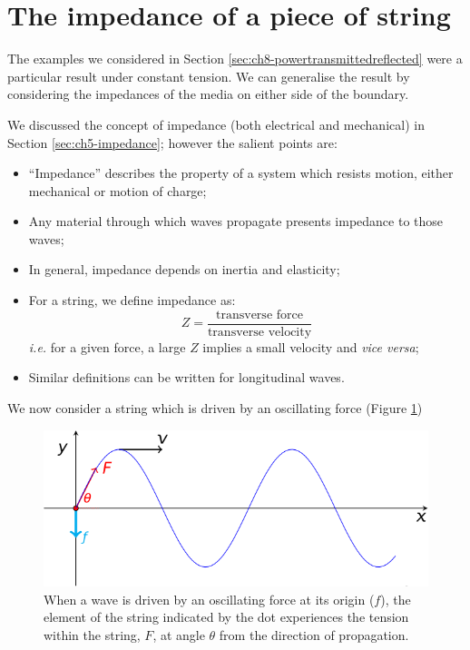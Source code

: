 \documentclass[
]{book}
\providecommand{\tightlist}{%
  \setlength{\itemsep}{0pt}\setlength{\parskip}{0pt}}
\begin{document}
\hypertarget{sec:ch8-stringimpedeance}{%
\section{The impedance of a piece of string}\label{sec:ch8-stringimpedeance}}

The examples we considered in Section \ref{sec:ch8-powertransmittedreflected} were a particular result under constant tension. We can generalise the result by considering the impedances of the media on either side of the boundary.

We discussed the concept of impedance (both electrical and mechanical) in Section \ref{sec:ch5-impedance}; however the salient points are:

\begin{itemize}
\tightlist
\item
  ``Impedance'' describes the property of a system which resists motion, either mechanical or motion of charge;
\item
  Any material through which waves propagate presents impedance to those waves;
\item
  In general, impedance depends on inertia and elasticity;
\item
  For a string, we define impedance as:
  \begin{equation}
  Z = \frac{\textrm{transverse force}}{\textrm{transverse velocity}}
  \end{equation}
  \emph{i.e.} for a given force, a large \(Z\) implies a small velocity and \emph{vice versa};
\item
  Similar definitions can be written for longitudinal waves.
\end{itemize}

We now consider a string which is driven by an oscillating force (Figure \ref{fig:ch8-impedencestring1})

\begin{figure}

{\centering \includegraphics[width=0.7\linewidth]{visualisations/LaTeX/ch8-wavesonstrings3} 

}

\caption{When a wave is driven by an oscillating force at its origin ($f$), the element of the string indicated by the dot experiences the tension within the string, $F$, at angle $\theta$ from the direction of propagation.}\label{fig:ch8-impedencestring1}
\end{figure}
\end{document}
